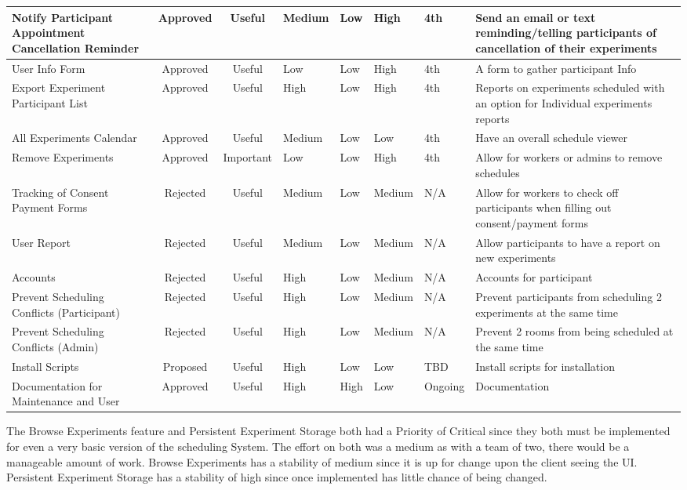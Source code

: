 \begin{table}[!h]
\begin{tabular}{|p{2.5cm}|c|c|p{1.25cm}|p{1cm}|p{1.25cm}|p{1cm}|p{3.75cm}|}
        \hline
         Notify Participant Appointment Cancellation Reminder & Approved & Useful & Medium & Low & High & 4th & Send an email or text reminding/telling participants of cancellation of their experiments \\
        \hline
        User Info Form & Approved & Useful & Low & Low & High & 4th & A form to gather participant Info \\
        \hline
        Export Experiment Participant List & Approved & Useful & High & Low & High & 4th & Reports on experiments scheduled with an option for Individual experiments reports \\
        \hline
        All Experiments Calendar & Approved & Useful & Medium & Low & Low & 4th & Have an overall schedule viewer \\
        \hline
        Remove Experiments & Approved & Important & Low & Low & High & 4th & Allow for workers or admins to remove schedules \\
        \hline
        Tracking of Consent Payment Forms & Rejected & Useful & Medium & Low & Medium & N/A & Allow for workers to check off participants when filling out consent/payment forms \\
        \hline
        User Report & Rejected & Useful & Medium & Low & Medium & N/A & Allow participants to have a report on new experiments \\
        \hline
        Accounts & Rejected & Useful & High & Low & Medium & N/A & Accounts for participant \\
        \hline
        Prevent Scheduling Conflicts (Participant) & Rejected & Useful & High & Low & Medium & N/A & Prevent participants from scheduling 2 experiments at the same time \\
        \hline
        Prevent Scheduling Conflicts (Admin) & Rejected & Useful & High & Low & Medium & N/A & Prevent 2 rooms from being scheduled at the same time \\
        \hline
        Install Scripts & Proposed & Useful & High & Low & Low & TBD & Install scripts for installation \\
        \hline
        Documentation for Maintenance and User & Approved & Useful & High & High & Low & Ongoing & Documentation \\
        \hline
    \end{tabular}
\end{table}
\clearpage

The Browse Experiments feature and Persistent Experiment Storage both had a Priority of Critical since they both must be implemented for even a very basic version of the scheduling System.  The effort on both was a medium as with a team of two, there would be a manageable amount of work.  Browse Experiments has a stability of medium since it is up for change upon the client seeing the UI.  Persistent Experiment Storage has a stability of high since once implemented has little chance of being changed.

